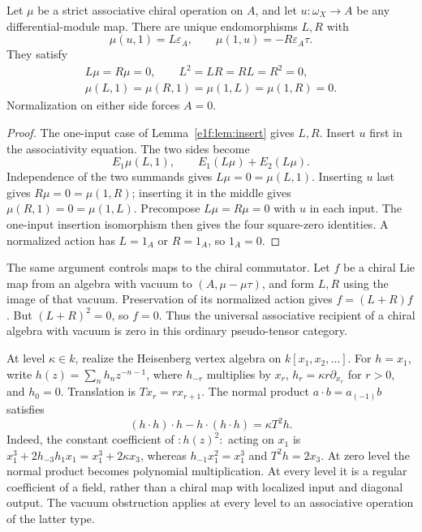 \begin{theorem}\label{e1f:thm:vacuum}
Let \(\mu\) be a strict associative chiral operation on \(A\),
and let \(u:\omega_X\to A\) be any differential-module map.
There are unique endomorphisms \(L,R\) with
\[
 \mu(u,1)=L\varepsilon_A,
 \qquad \mu(1,u)=-R\varepsilon_A\tau.
\]
They satisfy
\[
 \begin{gathered}
 L\mu=R\mu=0,\qquad L^2=LR=RL=R^2=0,\\
 \mu(L,1)=\mu(R,1)=\mu(1,L)=\mu(1,R)=0.
 \end{gathered}
\]
Normalization on either side forces \(A=0\).
\end{theorem}

\begin{proof}
The one-input case of Lemma~\ref{e1f:lem:insert} gives \(L,R\).
Insert \(u\) first in the associativity equation. The two
sides become
\[
 E_1\mu(L,1),\qquad E_1(L\mu)+E_2(L\mu).
\]
Independence of the two summands gives
\(L\mu=0=\mu(L,1)\). Inserting \(u\) last gives
\(R\mu=0=\mu(1,R)\); inserting it in the middle gives
\(\mu(R,1)=0=\mu(1,L)\). Precompose \(L\mu=R\mu=0\)
with \(u\) in each input. The one-input insertion isomorphism
then gives the four square-zero identities. A normalized action
has \(L=1_A\) or \(R=1_A\), so \(1_A=0\).
\end{proof}

The same argument controls maps to the chiral commutator.
Let \(f\) be a chiral Lie map from an algebra with vacuum to
\((A,\mu-\mu\tau)\), and form \(L,R\) using the image of
that vacuum. Preservation of its normalized action gives
\(f=(L+R)f\). But \((L+R)^2=0\), so \(f=0\).
Thus the universal associative recipient of a chiral algebra
with vacuum is zero in this ordinary pseudo-tensor category.

\begin{example}\label{e1f:ex:heisenberg}
At level \(\kappa\in k\), realize the Heisenberg vertex
algebra on \(k[x_1,x_2,\ldots]\). For \(h=x_1\), write
\(h(z)=\sum_nh_nz^{-n-1}\), where \(h_{-r}\) multiplies
by \(x_r\), \(h_r=\kappa r\partial_{x_r}\) for \(r>0\),
and \(h_0=0\). Translation is \(Tx_r=rx_{r+1}\).
The normal product \(a\cdot b=a_{(-1)}b\) satisfies
\[
 (h\cdot h)\cdot h-h\cdot(h\cdot h)=\kappa T^2h.
\]
Indeed, the constant coefficient of \(:h(z)^2:\) acting on
\(x_1\) is \(x_1^3+2h_{-3}h_1x_1=x_1^3+2\kappa x_3\),
whereas \(h_{-1}x_1^2=x_1^3\) and \(T^2h=2x_3\).
At zero level the normal product becomes polynomial
multiplication. At every level it is a regular coefficient
of a field, rather than a chiral map with localized input and
diagonal output. The vacuum obstruction applies at every level
to an associative operation of the latter type.
\end{example}

